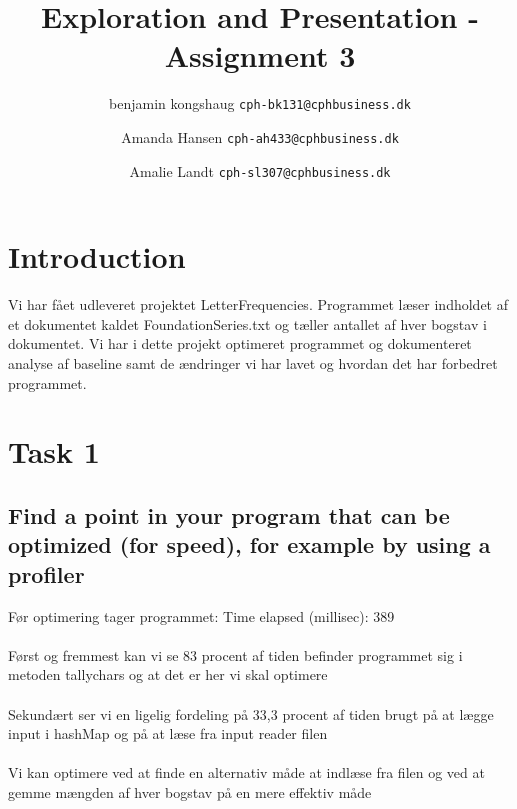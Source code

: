 \documentclass[12pt]{article}
\begin{document}
\title{Exploration and Presentation - Assignment 3}
\maketitle
\author{
  benjamin kongshaug
  \texttt{cph-bk131@cphbusiness.dk}

}
\author{
  Amanda Hansen
  \texttt{cph-ah433@cphbusiness.dk}

}
\author{
  Amalie Landt
  \texttt{cph-sl307@cphbusiness.dk}

}
\thispagestyle{empty}
\pagebreak

\setcounter{secnumdepth}{4}
\tableofcontents

\pagebreak

\newpage
\section{Introduction}

Vi har fået udleveret projektet LetterFrequencies. Programmet læser indholdet af et dokumentet kaldet FoundationSeries.txt og tæller antallet af hver bogstav i dokumentet. 
Vi har i dette projekt optimeret programmet og dokumenteret analyse af baseline samt de ændringer vi har lavet og hvordan det har forbedret programmet.
\newpage
\section{Task 1}

\subsection{Find a point in your program that can be optimized (for speed), for example by using a profiler}

Før optimering tager programmet: Time elapsed (millisec): 389 \\ \\
Først og fremmest kan vi se 83 procent af tiden befinder programmet sig i metoden tallychars og at det er her vi skal optimere \\ \\
Sekundært ser vi en ligelig fordeling på 33,3 procent af tiden brugt på at lægge input i hashMap og på at læse fra input reader filen \\ \\
Vi kan optimere ved at finde en alternativ måde at indlæse fra filen og ved at gemme mængden af hver bogstav på en mere effektiv måde
\end{document}
